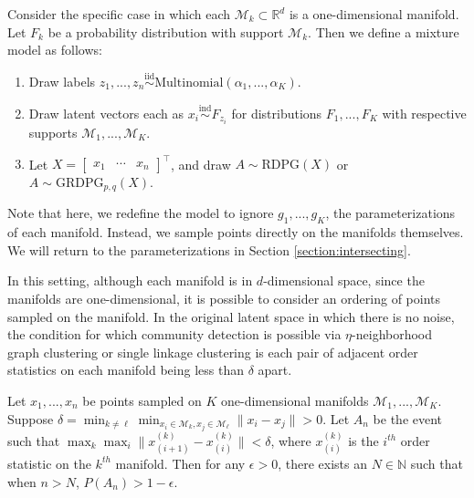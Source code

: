 \documentclass[12pt]{article}
\providecommand{\tightlist}{%
  \setlength{\itemsep}{0pt}\setlength{\parskip}{0pt}}
\begin{document}
Consider the specific case in which each
\(\mathcal{M}_k \subset \mathbb{R}^d\) is a one-dimensional manifold.
Let \(F_k\) be a probability distribution with support
\(\mathcal{M}_k\). Then we define a mixture model as follows:

\begin{enumerate}
\def\labelenumi{\arabic{enumi}.}
\tightlist
\item
  Draw labels
  \(z_1, ..., z_n \stackrel{\mathrm{iid}}{\sim}\mathrm{Multinomial}(\alpha_1, ..., \alpha_K)\).
\item
  Draw latent vectors each as
  \(x_i \stackrel{\mathrm{ind}}{\sim}F_{z_i}\) for distributions
  \(F_1, ..., F_K\) with respective supports
  \(\mathcal{M}_1, ..., \mathcal{M}_K\).
\item
  Let \(X = \begin{bmatrix} x_1 & \cdots & x_n \end{bmatrix}^\top\), and
  draw \(A \sim \mathrm{RDPG}(X)\) or
  \(A \sim \mathrm{GRDPG}_{p,q}(X)\).
\end{enumerate}

Note that here, we redefine the model to ignore \(g_1, ..., g_K\), the
parameterizations of each manifold. Instead, we sample points directly
on the manifolds themselves. We will return to the parameterizations in
Section \ref{section:intersecting}.

In this setting, although each manifold is in \(d\)-dimensional space,
since the manifolds are one-dimensional, it is possible to consider an
ordering of points sampled on the manifold. In the original latent space
in which there is no noise, the condition for which community detection
is possible via \(\eta\)-neighborhood graph clustering or single linkage
clustering is each pair of adjacent order statistics on each manifold
being less than \(\delta\) apart.

\begin{theorem}
\label{nonintersect-no-noise}
Let $x_1, ..., x_n$ be points sampled on $K$ one-dimensional manifolds $\mathcal{M}_1, ..., \mathcal{M}_K$. 
Suppose $\delta = \min_{k \neq \ell} \min_{x_i \in \mathcal{M}_k, x_j \in \mathcal{M}_\ell} \| x_i - x_j \| > 0$. 
Let $A_n$ be the event such that $\max_k \max_i \|x_{(i+1)}^{(k)} - x_{(i)}^{(k)}\| < \delta$, where $x_{(i)}^{(k)}$ is the $i^{th}$ order statistic on the $k^{th}$ manifold. 
Then for any $\epsilon > 0$, there exists an $N \in \mathbb{N}$ such that when $n > N$, $P(A_n) > 1 - \epsilon$. 
\end{theorem}
\end{document}
